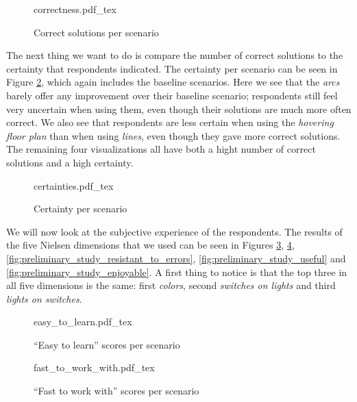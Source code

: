 \begin{figure}
    \centering
    \def\svgwidth{\columnwidth}
    {correctness.pdf_tex}
    \caption{Correct solutions per scenario}
    \label{fig:preliminary_study_correctness}
\end{figure}

The next thing we want to do is compare the number of correct solutions to the certainty that respondents indicated. The certainty per scenario can be seen in Figure \ref{fig:preliminary_study_certainties}, which again includes the baseline scenarios. Here we see that the \textit{arcs} barely offer any improvement over their baseline scenario; respondents still feel very uncertain when using them, even though their solutions are much more often correct. We also see that respondents are less certain when using the \textit{hovering floor plan} than when using \textit{lines}, even though they gave more correct solutions. The remaining four visualizations all have both a hight number of correct solutions and a high certainty.

\begin{figure}
    \centering
    \def\svgwidth{\columnwidth}
    {certainties.pdf_tex}
    \caption{Certainty per scenario}
    \label{fig:preliminary_study_certainties}
\end{figure}

We will now look at the subjective experience of the respondents. The results of the five Nielsen dimensions that we used can be seen in Figures \ref{fig:preliminary_study_easy_to_learn}, \ref{fig:preliminary_study_fast_to_work_with}, \ref{fig:preliminary_study_resistant_to_errors}, \ref{fig:preliminary_study_useful} and \ref{fig:preliminary_study_enjoyable}. A first thing to notice is that the top three in all five dimensions is the same: first \textit{colors}, second \textit{switches on lights} and third \textit{lights on switches}.

\begin{figure}
    \centering
    \def\svgwidth{\columnwidth}
    {easy_to_learn.pdf_tex}
    \caption{``Easy to learn'' scores per scenario}
    \label{fig:preliminary_study_easy_to_learn}
\end{figure}

\begin{figure}
    \centering
    \def\svgwidth{\columnwidth}
    {fast_to_work_with.pdf_tex}
    \caption{``Fast to work with'' scores per scenario}
    \label{fig:preliminary_study_fast_to_work_with}
\end{figure}

